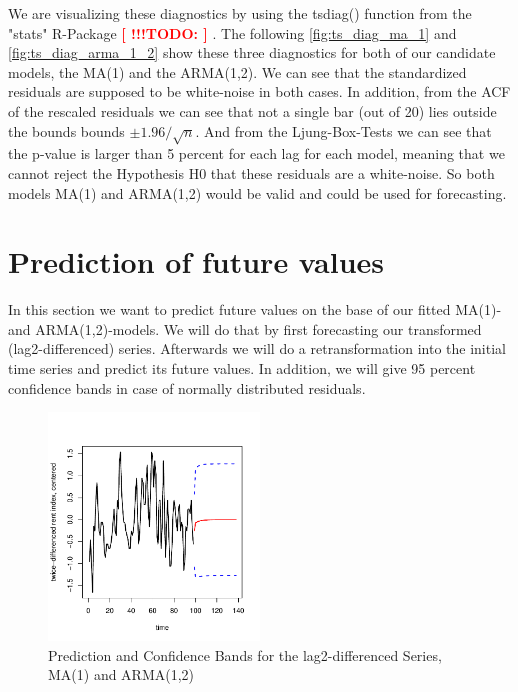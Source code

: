 \documentclass[11pt,a4paper]{article}
\newcommand{\TODO}[1]{%
    \textcolor{red}{ %
        \textbf{[ !!!TODO: #1 ]}%
    }%
    \PackageWarning{TODO:}{TODO: #1}%
}
\begin{document}
We are visualizing these diagnostics by using the tsdiag() function from the "stats" R-Package \TODO{}.
The following \cref{fig:ts_diag_ma_1} and \cref{fig:ts_diag_arma_1_2} show these three diagnostics for both of our candidate models, the MA(1) and the ARMA(1,2).
We can see that the standardized residuals are supposed to be white-noise in both cases.
In addition, from the ACF of the rescaled residuals we can see that not a single bar (out of 20) lies outside the bounds bounds $\pm 1.96 / \sqrt{n}$.
And from the Ljung-Box-Tests we can see that the p-value is larger than 5 percent for each lag for each model, meaning that we cannot reject the Hypothesis H0 that these residuals are a white-noise. So both models MA(1) and ARMA(1,2) would be valid and could be used for forecasting.



\section{Prediction of future values}

In this section we want to predict future values on the base of our fitted MA(1)- and ARMA(1,2)-models.
We will do that by first forecasting our transformed (lag2-differenced) series.
Afterwards we will do a retransformation into the initial time series and predict its future values.
In addition, we will give 95 percent confidence bands in case of normally distributed residuals.

\begin{figure}
    \centering
    \includegraphics[width=0.5\textwidth]{pred_transformed_series}
    \caption{Prediction and Confidence Bands for the lag2-differenced Series, MA(1) and ARMA(1,2)}
    \label{fig:pred_transformed_series}
\end{figure}
\end{document}
